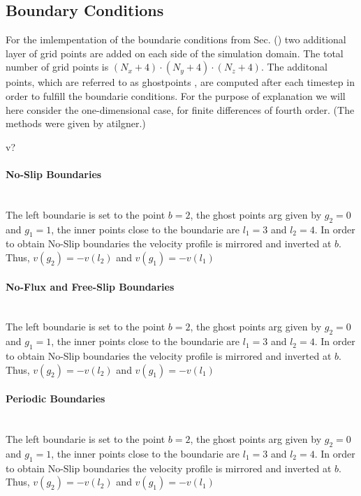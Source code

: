 \clearpage

\subsection{Boundary Conditions}

For the imlempentation of the boundarie conditions from Sec. () two additional layer of grid points
are added on each side of the simulation domain.
The total number of grid points is ${(N_x + 4)\cdot(N_y + 4)\cdot(N_z + 4)}$.
The additonal points, which are referred to as ghostpoints \citep{ctie},
are computed after each timestep in order to fulfill the boundarie conditions.
For the purpose of explanation we will here consider the one-dimensional case,
for finite differences of fourth order. (The methods were given by atilgner.)

v?

\paragraph{No-Slip Boundaries}\mbox{}\\

The left boundarie is set to the point $b=2$,
the ghost points arg given by $g_2=0$ and $g_1=1$, the inner points close
to the boundarie are $l_1=3$ and $l_2=4$.
In order to obtain No-Slip boundaries the velocity profile is mirrored and inverted
at $b$. Thus, $v(g_2) = -v(l_2)$ and  $v(g_1) = -v(l_1)$



\paragraph{No-Flux and Free-Slip Boundaries}\mbox{}\\

The left boundarie is set to the point $b=2$,
the ghost points arg given by $g_2=0$ and $g_1=1$, the inner points close
to the boundarie are $l_1=3$ and $l_2=4$.
In order to obtain No-Slip boundaries the velocity profile is mirrored and inverted
at $b$. Thus, $v(g_2) = -v(l_2)$ and  $v(g_1) = -v(l_1)$


\paragraph{Periodic Boundaries}\mbox{}\\

The left boundarie is set to the point $b=2$,
the ghost points arg given by $g_2=0$ and $g_1=1$, the inner points close
to the boundarie are $l_1=3$ and $l_2=4$.
In order to obtain No-Slip boundaries the velocity profile is mirrored and inverted
at $b$. Thus, $v(g_2) = -v(l_2)$ and  $v(g_1) = -v(l_1)$

